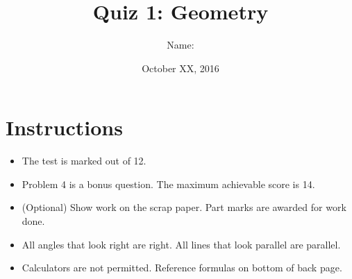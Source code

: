 \documentclass[12pt,letterpaper]{article}
\title{Quiz 1: Geometry}
\author{Name: \underline{\hspace{5cm}} \OutOf{12}}
\date{October XX, 2016}
\begin{document}
\newcommand*\circleletter[1]{%
  \begin{tikzpicture}[baseline=(C.base)]
    \node[draw,circle,inner sep=1pt](C) {#1};
  \end{tikzpicture}}

\maketitle

\thispagestyle{empty}

\section*{Instructions}
\begin{itemize}
  \item The test is marked out of 12.
  \item Problem 4 is a bonus question. The maximum achievable score is 14.
  \item (Optional) Show work on the scrap paper. Part marks are awarded for
  work done.
  \item All angles that look right are right. All lines that look parallel are
  parallel.
  \item Calculators are not permitted. Reference formulas on bottom of back
  page.
\end{itemize}
\end{document}
